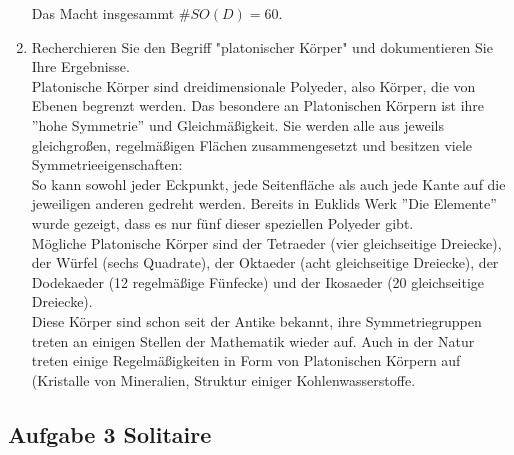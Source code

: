 \documentclass[11pt,a4paper,ngerman]{article}
\begin{document}
\begin{enumerate}[\bfseries (a)]
Das Macht insgesammt $\# SO(D) = 60$. 

\item Recherchieren Sie den Begriff "platonischer Körper" {} und dokumentieren Sie Ihre Ergebnisse.\\

Platonische Körper sind dreidimensionale Polyeder, also Körper, die von Ebenen begrenzt werden. Das besondere an Platonischen Körpern ist ihre ''hohe Symmetrie'' und Gleichmäßigkeit. Sie werden alle aus jeweils gleichgroßen, regelmäßigen Flächen zusammengesetzt und besitzen viele Symmetrieeigenschaften:\\
So kann sowohl jeder Eckpunkt, jede Seitenfläche als auch jede Kante auf die jeweiligen anderen gedreht werden. Bereits in Euklids Werk ''Die Elemente'' wurde gezeigt, dass es nur fünf dieser speziellen Polyeder gibt.
\\Mögliche Platonische Körper sind der Tetraeder (vier gleichseitige Dreiecke), der Würfel (sechs Quadrate), der Oktaeder (acht gleichseitige Dreiecke), der Dodekaeder (12 regelmäßige Fünfecke) und der Ikosaeder (20 gleichseitige Dreiecke).
\\Diese Körper sind schon seit der Antike bekannt, ihre Symmetriegruppen treten an einigen Stellen der Mathematik wieder auf. Auch in der Natur treten einige Regelmäßigkeiten in Form von Platonischen Körpern auf (Kristalle von Mineralien, Struktur einiger Kohlenwasserstoffe.
\end{enumerate}

\subsection*{Aufgabe 3 \mdseries Solitaire}
\end{document}
